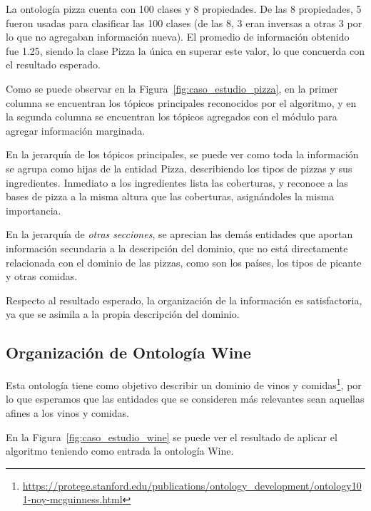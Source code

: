 La ontología pizza cuenta con 100 clases y 8 propiedades. De las 8 propiedades, 5 fueron usadas  para clasificar las 100 clases (de las 8, 3 eran inversas a otras 3 por lo que no agregaban información nueva). El promedio de información obtenido fue 1.25, siendo la clase Pizza la única en superar este valor, lo que concuerda con el resultado esperado.

Como se puede observar en la Figura~\ref{fig:caso_estudio_pizza}, en la primer columna se encuentran los tópicos principales reconocidos por el algoritmo, y en la segunda columna se encuentran los tópicos agregados con el módulo para agregar información marginada.

En la jerarquía de los tópicos principales, se puede ver como toda la información se agrupa como hijas de la entidad Pizza, describiendo los tipos de pizzas y sus ingredientes. Inmediato a los ingredientes lista las coberturas, y reconoce a las bases de pizza a la misma altura que las coberturas, asignándoles la misma importancia.

En la jerarquía de \emph{otras secciones}, se aprecian las demás entidades que aportan información secundaria a la descripción del dominio, que no está directamente relacionada con el dominio de las pizzas, como son los países, los tipos de picante y otras comidas.

Respecto al resultado esperado, la organización de la información es satisfactoria, ya que se asimila a la propia descripción del dominio. 

\subsection{Organización de Ontología Wine}
Esta ontología tiene como objetivo describir un dominio de vinos y comidas\footnote{\url{https://protege.stanford.edu/publications/ontology_development/ontology101-noy-mcguinness.html}}, por lo que esperamos que las entidades que se consideren más relevantes sean aquellas afines a los vinos y comidas.

En la Figura~\ref{fig:caso_estudio_wine} se puede ver el resultado de aplicar el algoritmo teniendo como entrada la ontología Wine.

